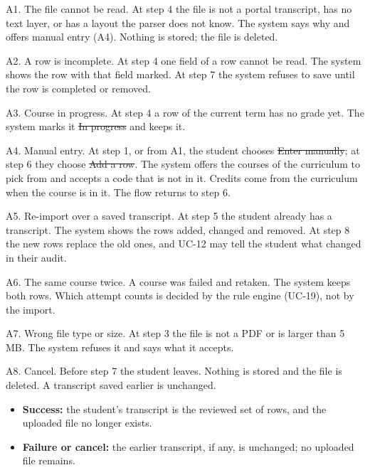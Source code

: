 \begin{altflows}
  \item[A1. The file cannot be read.] At step 4 the file is not a portal transcript, has no text layer, or has a layout the
        parser does not know. The system says why and offers manual entry (A4). Nothing is stored; the file is deleted.
  \item[A2. A row is incomplete.] At step 4 one field of a row cannot be read. The system shows the row with that field
        marked. At step 7 the system refuses to save until the row is completed or removed.
  \item[A3. Course in progress.] At step 4 a row of the current term has no grade yet. The system marks it
        \st{In progress} and keeps it.
  \item[A4. Manual entry.] At step 1, or from A1, the student chooses \st{Enter manually}; at step 6 they choose
        \st{Add a row}. The system offers the courses of the curriculum to pick from and accepts a code that is not in it.
        Credits come from the curriculum when the course is in it. The flow returns to step 6.
  \item[A5. Re-import over a saved transcript.] At step 5 the student already has a transcript. The system shows the rows
        added, changed and removed. At step 8 the new rows replace the old ones, and UC-12 may tell the student what changed
        in their audit.
  \item[A6. The same course twice.] A course was failed and retaken. The system keeps both rows. Which attempt counts is
        decided by the rule engine (UC-19), not by the import.
  \item[A7. Wrong file type or size.] At step 3 the file is not a PDF or is larger than 5 MB. The system refuses it and
        says what it accepts.
  \item[A8. Cancel.] Before step 7 the student leaves. Nothing is stored and the file is deleted. A transcript saved earlier
        is unchanged.
\end{altflows}

\begin{itemize}
  \item \textbf{Success:} the student's transcript is the reviewed set of rows, and the uploaded file no longer exists.
  \item \textbf{Failure or cancel:} the earlier transcript, if any, is unchanged; no uploaded file remains.
\end{itemize}

